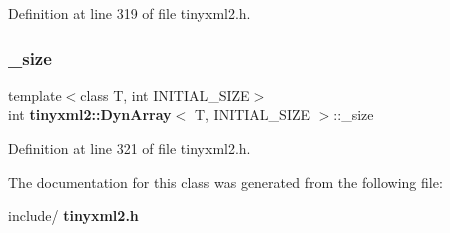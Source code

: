 Definition at line 319 of file tinyxml2.\+h.

\mbox{\label{classtinyxml2_1_1_dyn_array_a40f0578cc1912eed17fb29f64daf6ae9}} 
\subsubsection{\+\_\+size}
{\footnotesize\ttfamily template$<$class T, int I\+N\+I\+T\+I\+A\+L\+\_\+\+S\+I\+ZE$>$ \\
int \textbf{ tinyxml2\+::\+Dyn\+Array}$<$ T, I\+N\+I\+T\+I\+A\+L\+\_\+\+S\+I\+ZE $>$\+::\+\_\+size\hspace{0.3cm}{\ttfamily [private]}}



Definition at line 321 of file tinyxml2.\+h.



The documentation for this class was generated from the following file\+:\begin{DoxyCompactItemize}
\item 
include/\textbf{ tinyxml2.\+h}\end{DoxyCompactItemize}
